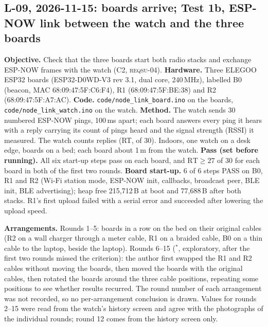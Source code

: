 \IfFileExists{IEEEtran.cls}{\documentclass[conference]{IEEEtran}}{\documentclass[10pt,twocolumn]{article}}
\newcommand{\req}[1]{\textsc{reqsu-}#1}
\begin{document}
\subsection*{L-09, 2026-11-15: boards arrive; Test 1b, ESP-NOW link between the watch and the three boards}
\textbf{Objective.} Check that the three boards start both radio stacks and exchange ESP-NOW frames with the watch (C2, \req{04}). \textbf{Hardware.} Three ELEGOO ESP32 boards (ESP32-D0WD-V3 rev 3.1, dual core, 240\,MHz), labelled B0 (beacon, MAC 68:09:47:5F:C6:F4), R1 (68:09:47:5F:BE:38) and R2 (68:09:47:5F:A7:AC). \textbf{Code.} \texttt{code/node\_link\_board.ino} on the boards, \texttt{code/node\_link\_watch.ino} on the watch. \textbf{Method.} The watch sends 30 numbered ESP-NOW pings, 100\,ms apart; each board answers every ping it hears with a reply carrying its count of pings heard and the signal strength (RSSI) it measured. The watch counts replies (RT, of 30). Indoors, one watch on a desk edge, boards on a bed; each board about 1\,m from the watch. \textbf{Pass (set before running).} All six start-up steps pass on each board, and $\mathrm{RT}\ge 27$ of 30 for each board in both of the first two rounds. \textbf{Board start-up.} 6 of 6 steps PASS on B0, R1 and R2 (Wi-Fi station mode, ESP-NOW init, callbacks, broadcast peer, BLE init, BLE advertising); heap free 215{,}712\,B at boot and 77{,}688\,B after both stacks. R1's first upload failed with a serial error and succeeded after lowering the upload speed.

\textbf{Arrangements.} Rounds 1--5: boards in a row on the bed on their original cables (R2 on a wall charger through a meter cable, R1 on a braided cable, B0 on a thin cable to the laptop, beside the laptop). Rounds 6--15 ($^{*}$, exploratory, after the first two rounds missed the criterion): the author first swapped the R1 and R2 cables without moving the boards, then moved the boards with the original cables, then rotated the boards around the three cable positions, repeating some positions to see whether results recurred. The round number of each arrangement was not recorded, so no per-arrangement conclusion is drawn. Values for rounds 2--15 were read from the watch's history screen and agree with the photographs of the individual rounds; round 12 comes from the history screen only.
\end{document}
